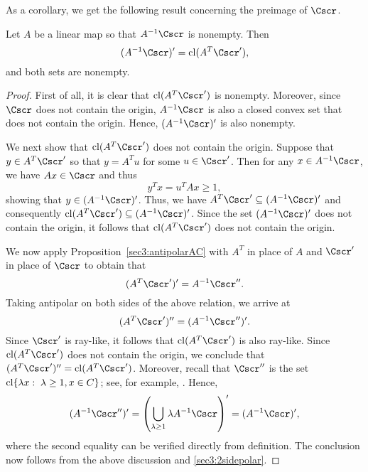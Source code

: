 \documentclass{siamltex}   %
\begin{document}
  As a corollary, we get the following result concerning the preimage of $\Cscr$.
  \begin{corollary}\label{sec3:cor1}
    Let $A$ be a linear map so that $A^{-1}\Cscr$ is nonempty. Then
    \[
    (A^{-1}\Cscr)' = {\rm cl}(A^T\Cscr'),
    \]
    and both sets are nonempty.
  \end{corollary}
  \begin{proof}
    First of all, it is clear that ${\rm cl}(A^T\Cscr')$ is nonempty. Moreover, since $\Cscr$ does not contain the origin, $A^{-1}\Cscr$
    is also a closed convex set that does not contain the origin. Hence, $(A^{-1}\Cscr)'$ is also nonempty.

    We next show that ${\rm cl}(A^T\Cscr')$ does not contain the origin. Suppose that $y\in A^T\Cscr'$ so that
    $y = A^Tu$ for some $u\in \Cscr'$. Then for any $x\in A^{-1}\Cscr$, we have
    $Ax\in \Cscr$ and thus
    \[
    y^Tx = u^TAx \ge 1,
    \]
    showing that $y\in (A^{-1}\Cscr)'$. Thus, we have $A^T\Cscr'\subseteq (A^{-1}\Cscr)'$ and consequently ${\rm cl}(A^T\Cscr')\subseteq (A^{-1}\Cscr)'$.
    Since the set $(A^{-1}\Cscr)'$ does not contain the origin, it follows that ${\rm cl}(A^T\Cscr')$ does not contain the origin.

    We now apply Proposition~\ref{sec3:antipolarAC} with $A^T$ in place of $A$ and $\Cscr'$ in place of $\Cscr$ to obtain that
    \begin{equation*}
      (A^T\Cscr')' = A^{-1}\Cscr''.
    \end{equation*}
    Taking antipolar on both sides of the above relation, we arrive at
    \begin{equation}\label{sec3:2sidepolar}
    (A^T\Cscr')'' = (A^{-1}\Cscr'')'.
    \end{equation}
    Since $\Cscr'$ is ray-like,
    it follows that ${\rm cl}(A^T\Cscr')$ is also ray-like. Since ${\rm cl}(A^T\Cscr')$ does not contain the origin, we conclude that
    $(A^T\Cscr')'' = {\rm cl}(A^T\Cscr')$. Moreover, recall that $\Cscr''$ is the set ${\rm cl}\{\lambda x:\; \lambda\ge 1, x\in C\}$;
    see, for example, \cite[Page~176]{McLinden:1978}. Hence,
    \[
    (A^{-1}\Cscr'')' = \left(\bigcup_{\lambda\ge 1}\lambda A^{-1}\Cscr\right)' = (A^{-1}\Cscr)',
    \]
    where the second equality can be verified directly from definition. The conclusion now follows from the above discussion and \eqref{sec3:2sidepolar}.
  \end{proof}
  
\end{document}
